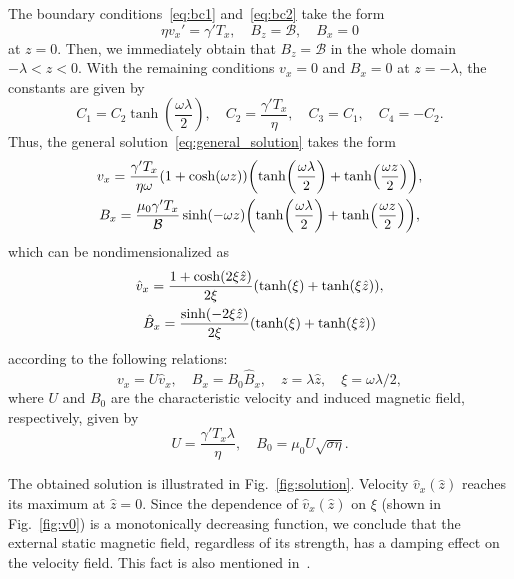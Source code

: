 \documentclass{article}
\begin{document}
The boundary conditions~\eqref{eq:bc1} and~\eqref{eq:bc2} take the form
\begin{equation}\label{eq:bc}
    \eta v_x' = \gamma'T_x, \quad B_z = \mathcal{B}, \quad B_x = 0
\end{equation}
at $z=0$.
Then, we immediately obtain that $B_z=\mathcal{B}$ in the whole domain $-\lambda<z<0$.
With the remaining conditions $v_x=0$ and $B_x=0$ at $z=-\lambda$,
the constants are given by
\begin{equation}\label{eq:constants}
    C_1 = C_2\tanh(\frac{\omega\lambda}2), \quad
    C_2 = \frac{\gamma'T_x}{\eta}, \quad
    C_3 = C_1, \quad C_4 = -C_2.
\end{equation}
Thus, the general solution~\eqref{eq:general_solution} takes the form
\begin{gather}
    v_x = \frac{\gamma'T_x}{\eta\omega}(1+\cosh(\omega z))
        \qty(\tanh(\frac{\omega\lambda}2) + \tanh(\frac{\omega z}2)), \label{eq:v_x}\\
    B_x = \frac{\mu_0\gamma'T_x}{\mathcal{B}}\sinh(-\omega z)
        \qty(\tanh(\frac{\omega\lambda}2) + \tanh(\frac{\omega z}2)), \label{eq:B_x}
\end{gather}
which can be nondimensionalized as
\begin{gather}
    \hat{v}_x = \frac{1+\cosh(2\xi\hat{z})}{2\xi}
        \qty( \tanh(\xi) + \tanh(\xi\hat{z}) ), \label{eq:hatv_x}\\
    \hat{B}_x = \frac{\sinh(-2\xi\hat{z})}{2\xi}
        \qty( \tanh(\xi) + \tanh(\xi\hat{z}) ) \label{eq:hatB_x}
\end{gather}
according to the following relations:
\begin{equation}\label{eq:nondimensioned}
    v_x = U \hat{v}_x, \quad B_x = B_0 \hat{B}_x, \quad
    z = \lambda \hat{z}, \quad \xi = \omega\lambda/2,
\end{equation}
where $U$ and $B_0$ are the characteristic velocity and induced magnetic field,
respectively, given by
\begin{equation}\label{eq:characteristic}
    U = \frac{\gamma'T_x\lambda}{\eta}, \quad
    B_0 = \mu_0U\sqrt{\sigma\eta}.
\end{equation}

The obtained solution is illustrated in Fig.~\ref{fig:solution}.
Velocity $\hat{v}_x(\hat{z})$ reaches its maximum at $\hat{z}=0$.
Since the dependence of $\hat{v}_x(\hat{z})$ on $\xi$ (shown in Fig.~\ref{fig:v0})
is a monotonically decreasing function, we conclude that the external static magnetic field,
regardless of its strength, has a damping effect on the velocity field.
This fact is also mentioned in~\cite{du2019influence}.
\end{document}
